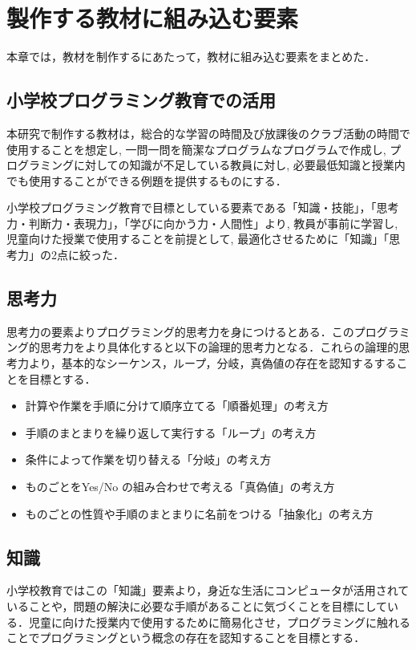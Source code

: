\newpage

\section{\rm 製作する教材に組み込む要素}
本章では，教材を制作するにあたって，教材に組み込む要素をまとめた．

\subsection{小学校プログラミング教育での活用}
本研究で制作する教材は，総合的な学習の時間及び放課後のクラブ活動の時間で使用することを想定し, 一問一問を簡潔なプログラムなプログラムで作成し, プログラミングに対しての知識が不足している教員に対し, 必要最低知識と授業内でも使用することができる例題を提供するものにする．

小学校プログラミング教育で目標としている要素である「知識・技能」，「思考力・判断力・表現力」，「学びに向かう力・人間性」より, 教員が事前に学習し, 児童向けた授業で使用することを前提として, 最適化させるために「知識」「思考力」の2点に絞った．

\subsection{思考力}
思考力の要素よりプログラミング的思考力を身につけるとある．このプログラミング的思考力をより具体化すると以下の論理的思考力となる．これらの論理的思考力より，基本的なシーケンス，ループ，分岐，真偽値の存在を認知するすることを目標とする．
\begin{itemize}
\item 計算や作業を手順に分けて順序立てる「順番処理」の考え方\\
\item 手順のまとまりを繰り返して実行する「ループ」の考え方\\
\item 条件によって作業を切り替える「分岐」の考え方\\
\item ものごとをYes/No の組み合わせで考える「真偽値」の考え方\\
\item ものごとの性質や手順のまとまりに名前をつける「抽象化」の考え方
\end{itemize}

\subsection{知識}
小学校教育ではこの「知識」要素より，身近な生活にコンピュータが活用されていることや，問題の解決に必要な手順があることに気づくことを目標にしている．児童に向けた授業内で使用するために簡易化させ，プログラミングに触れることでプログラミングという概念の存在を認知することを目標とする．

